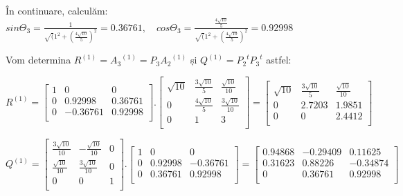 \documentclass{exam}
\begin{document}
În continuare, calculăm:
$sin\Theta_{3}=\frac{1}{\sqrt({1}^{2}+{(\frac{4\sqrt{10}}{5})}^{2}} = 0.36761, \quad
	cos\Theta_{3}=\frac{\frac{4\sqrt{10}}{5}}{\sqrt({1}^{2}+{(\frac{4\sqrt{10}}{5})}^{2}}=0.92998$

Vom determina $R^{(1)} = {A_{3}}^{(1)} = P_{3}{A_{2}}^{(1)}$ și $Q^{(1)} = {P_{2}}^{t}{P_{3}}^{t}$ astfel:

$
	R^{(1)}=
	\left[\begin{array}{ccc}
			1 & 0        & 0       \\
			0 & 0.92998  & 0.36761 \\
			0 & -0.36761 & 0.92998 \\
		\end{array}\right] .
	\left[\begin{array}{ccc}
			\sqrt{10} & \frac{3\sqrt{10}}{5} & \frac{\sqrt{10}}{10}  \\
			0         & \frac{4\sqrt{10}}{5} & \frac{3\sqrt{10}}{10} \\
			0         & 1                    & 3                     \\
		\end{array}\right] =
	\left[\begin{array}{ccc}
			\sqrt{10} & \frac{3\sqrt{10}}{5} & \frac{\sqrt{10}}{10} \\
			0         & 2.7203               & 1.9851               \\
			0         & 0                    & 2.4412               \\
		\end{array}\right]
$

$
	Q^{(1)}=
	\left[\begin{array}{ccc}
			\frac{3\sqrt{10}}{10} & -\frac{\sqrt{10}}{10} & 0 \\
			\frac{\sqrt{10}}{10}  & \frac{3\sqrt{10}}{10} & 0 \\
			0                     & 0                     & 1 \\
		\end{array}\right] .
	\left[\begin{array}{ccc}
			1 & 0       & 0        \\
			0 & 0.92998 & -0.36761 \\
			0 & 0.36761 & 0.92998  \\
		\end{array}\right]=
	\left[\begin{array}{ccc}
			0.94868 & -0.29409 & 0.11625  \\
			0.31623 & 0.88226  & -0.34874 \\
			0       & 0.36761  & 0.92998  \\
		\end{array}\right]
$
\end{document}
